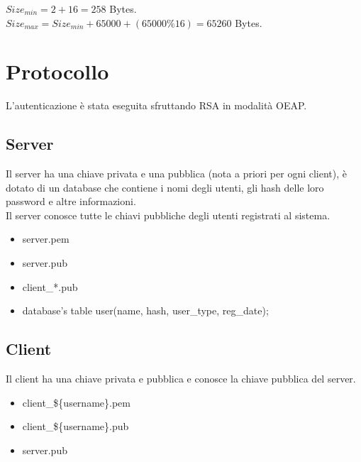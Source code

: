 \documentclass[a4paper,titlepage]{article}
\begin{document}
$Size_{min} = 2 + 16 = 258$ Bytes.\\
$Size_{max} = Size_{min} + 65000 + ( 65000 \% 16 ) = 65260 $ Bytes.

\section{Protocollo}
L'autenticazione è stata eseguita sfruttando RSA in modalità OEAP.
\subsection{Server}
Il server ha una chiave privata e una pubblica (nota a priori per ogni client), è dotato di un database che contiene i nomi degli utenti, gli hash delle loro password e altre informazioni.\\
Il server conosce tutte le chiavi pubbliche degli utenti registrati al sistema.
\begin{itemize}
\item server.pem
\item server.pub
\item client\_*.pub
\item database's table user(name, hash, user\_type, reg\_date);
\end{itemize}

\subsection{Client}
Il client ha una chiave privata e pubblica e conosce la chiave pubblica del server.
\begin{itemize}
\item client\_\$\{username\}.pem
\item client\_\$\{username\}.pub
\item server.pub
\end{itemize}
\end{document}
